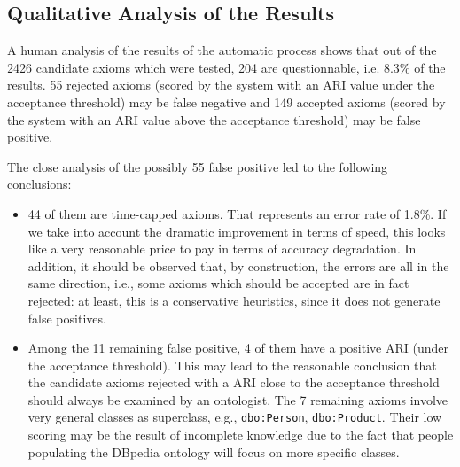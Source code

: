 \documentclass[conference]{IEEEtran}
\begin{document}
\subsection{Qualitative Analysis of the Results}

A human analysis of the results of the automatic process shows that out of the 2426 candidate axioms which were tested, 204 are questionnable, i.e. $8.3\%$ of the results. 55 rejected axioms (scored by the system with an ARI value under the acceptance threshold) may be false negative and 149 accepted axioms (scored by the system with an ARI value above the acceptance threshold) may be false positive. 

The close analysis of the possibly 55 false positive led to the following conclusions:
\begin{itemize}
\item 44 of them are time-capped axioms. That represents an error rate of 1.8\%. If we take into account the dramatic
improvement in terms of speed, this looks like a very reasonable price to pay
in terms of accuracy degradation. In addition, it should be observed that,
by construction, the errors are all in the same direction, i.e., some axioms
which should be accepted are in fact rejected: at least, this is a conservative
heuristics, since it does not generate false positives.
\item Among the 11 remaining false positive, 4 of them have a positive ARI (under the acceptance threshold). This may lead to the reasonable conclusion that the candidate axioms rejected with a ARI close to the acceptance threshold should always be examined by an ontologist. The 7 remaining axioms involve very general classes as superclass, e.g., \texttt{dbo:Person}, \texttt{dbo:Product}. Their low scoring may be the result of incomplete knowledge due to the fact that people populating the DBpedia ontology will focus on more specific classes. 
\end{itemize}
\end{document}

